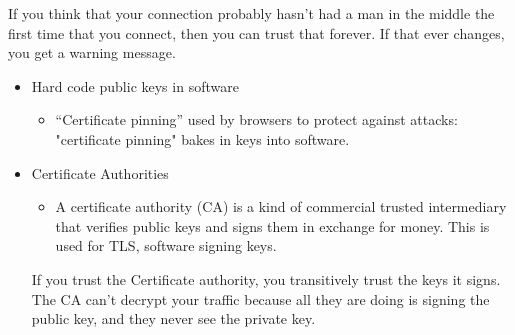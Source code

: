 \documentclass[11pt]{article} %
\begin{document}
If you think that your connection probably hasn't had a man in the middle the first time that you connect, then you can trust that forever. If that ever changes, you get a warning message.

\begin{itemize}
  \item Hard code public keys in software
  \begin{itemize}\item “Certificate pinning” used by browsers to protect against attacks: "certificate pinning" bakes in keys into software.
 
  \end{itemize}
\end{itemize}

\begin{itemize}
  \item Certificate Authorities
  \begin{itemize}
  \item A certificate authority (CA) is  a kind of commercial trusted intermediary that verifies public keys and signs them in exchange for money. This is used for TLS, software signing keys. 
  \end{itemize}
    If you trust the Certificate authority, you transitively trust the keys it signs. The CA can't decrypt your traffic because all they are doing is signing the public key, and they never see the private key.
\end{itemize}
\end{document}
